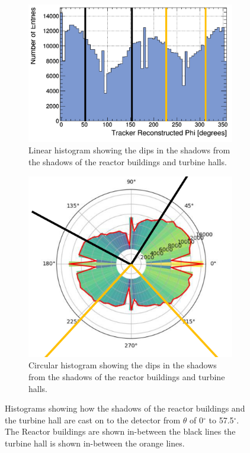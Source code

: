 \begin{figure}[H]
\centering
\begin{subfigure}{.5\textwidth}
  \centering
  \includegraphics[width=\linewidth]{Chapter5/Figs/Raster/linReversedWylfaSlice0-57.5.png}
  \captionsetup{width=.9\linewidth}
  \caption{Linear histogram showing the dips in the shadows from the shadows of the reactor buildings and turbine halls.}
  \label{subFig:linReversedWylfaSlice0-57.5}
\end{subfigure}%
\begin{subfigure}{.5\textwidth}
  \centering
  \includegraphics[width=0.765\linewidth]{Chapter5/Figs/Raster/cirReversedWylfaSlice0-57.5.png}
  \captionsetup{width=.9\linewidth}
  \caption{Circular histogram showing the dips in the shadows from the shadows of the reactor buildings and turbine halls.}
  \label{subFig:linReversedWylfaSlice0-57.5}
\end{subfigure}
\caption{Histograms showing how the shadows of the reactor buildings and the turbine hall are cast on to the detector from $\theta$ of 0$^\circ$ to 57.5$^\circ$. The Reactor buildings are shown in-between the black lines the turbine hall is shown in-between the orange lines.}
\label{fig:WylfaSlice0-57.5}
\end{figure}

